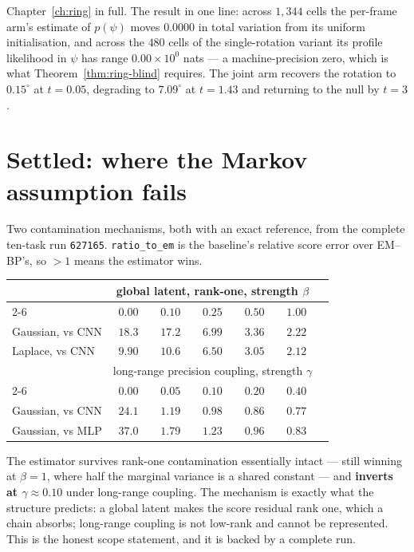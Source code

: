 Chapter~\ref{ch:ring} in full. The result in one line: across $1{,}344$ cells the per-frame arm's
estimate of $p(\psi)$ moves $0.0000$ in total variation from its uniform initialisation, and
across the $480$ cells of the single-rotation variant its profile likelihood in $\psi$ has range
$0.00\times10^{0}$ nats --- a machine-precision zero, which is what
Theorem~\ref{thm:ring-blind} requires. The joint arm recovers the rotation to $0.15^\circ$ at
$t=0.05$, degrading to $7.09^\circ$ at $t=1.43$ and returning to the null by $t=3$.

\section{Settled: where the Markov assumption fails}
\label{sec:rec-nonmarkov}

Two contamination mechanisms, both with an exact reference, from the complete ten-task run
\texttt{627165}. \texttt{ratio\_to\_em} is the baseline's relative score error over EM--BP's, so
$>1$ means the estimator wins.

\begin{center}\small
\begin{tabular}{@{}lcccccc@{}}
\toprule
& \multicolumn{5}{c}{global latent, rank-one, strength $\beta$} \\
\cmidrule(lr){2-6}
& $0.00$ & $0.10$ & $0.25$ & $0.50$ & $1.00$ \\
\midrule
Gaussian, vs CNN & $18.3$ & $17.2$ & $6.99$ & $3.36$ & $2.22$ \\
Laplace, vs CNN  & $9.90$ & $10.6$ & $6.50$ & $3.05$ & $2.12$ \\
\midrule
& \multicolumn{5}{c}{long-range precision coupling, strength $\gamma$} \\
\cmidrule(lr){2-6}
& $0.00$ & $0.05$ & $0.10$ & $0.20$ & $0.40$ \\
\midrule
Gaussian, vs CNN & $24.1$ & $1.19$ & $\mathbf{0.98}$ & $0.86$ & $0.77$ \\
Gaussian, vs MLP & $37.0$ & $1.79$ & $1.23$ & $0.96$ & $0.83$ \\
\bottomrule
\end{tabular}
\end{center}

The estimator survives rank-one contamination essentially intact --- still winning at $\beta=1$,
where half the marginal variance is a shared constant --- and \textbf{inverts at
$\gamma\approx0.10$} under long-range coupling. The mechanism is exactly what the structure
predicts: a global latent makes the score residual rank one, which a chain absorbs; long-range
coupling is not low-rank and cannot be represented. This is the honest scope statement, and it is
backed by a complete run.

